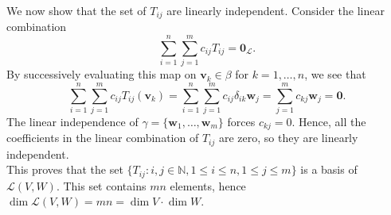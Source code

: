 \documentclass[10pt]{article}
\def\v{\bm{v}}
\def\w{\bm{w}}
\def\L{\mathcal{L}}
\def\dim{\operatorname{dim}}
\begin{document}
        We now show that the set of $T_{ij}$ are linearly independent.
        Consider the linear combination 
        \[
                \sum_{i = 1}^n \sum_{j = 1}^m c_{ij} T_{ij} = \mathbf{0}_\L.
        \]
        By successively evaluating this map on $\v_k \in \beta$ for $k = 1, \dots, n$, we see that
        \[
                \sum_{i = 1}^n \sum_{j = 1}^m c_{ij} T_{ij}(\v_k) = 
                \sum_{i = 1}^n \sum_{j = 1}^m c_{ij} \delta_{ik}\w_j = \sum_{j = 1}^m c_{kj}\w_j = \mathbf{0}.
        \]
        The linear independence of $\gamma = \{\w_1, \dots, \w_m\}$ forces $c_{kj} = 0$.
        Hence, all the coefficients in the linear combination of $T_{ij}$ are zero, so they are linearly independent. \\

        This proves that the set $\{T_{ij}\colon i, j \in \mathbb{N}, 1 \leq i \leq n, 1\leq j \leq m\}$ is a basis of $\L(V, W)$.
        This set contains $mn$ elements, hence $\dim \L(V, W) = mn = \dim V \cdot \dim W$.
\end{document}
